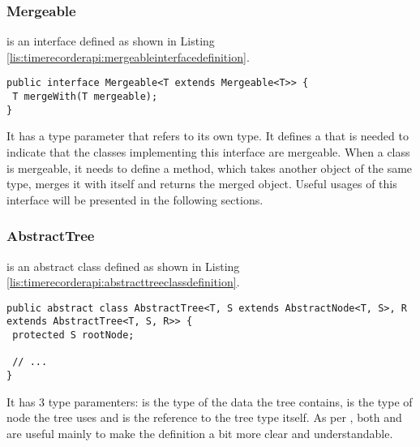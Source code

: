 \subsubsection{Mergeable}
 is an interface defined as shown in Listing \ref{lis:timerecorderapi:mergeableinterfacedefinition}.

\noindent\begin{minipage}[c]{\linewidth}
\begin{lstlisting}[breaklines,caption={Mergeable interface definition},label=lis:timerecorderapi:mergeableinterfacedefinition]
public interface Mergeable<T extends Mergeable<T>> {
 T mergeWith(T mergeable);
}
\end{lstlisting}
\end{minipage}

\noindent It has a type parameter  that refers to its own type. It defines a  that is needed to indicate that the classes implementing this interface are mergeable. When a class is mergeable, it needs to define a  method, which takes another object of the same type, merges it with itself and returns the merged object. Useful usages of this interface will be presented in the following sections.

\subsubsection{AbstractTree}

 is an abstract class defined as shown in Listing \ref{lis:timerecorderapi:abstracttreeclassdefinition}.

\noindent\begin{minipage}[c]{\linewidth}
\begin{lstlisting}[breaklines,caption={AbstractTree class definition},label=lis:timerecorderapi:abstracttreeclassdefinition]
public abstract class AbstractTree<T, S extends AbstractNode<T, S>, R extends AbstractTree<T, S, R>> {
 protected S rootNode;
 
 // ...
}
\end{lstlisting}
\end{minipage}

\noindent It has 3 type paramenters:  is the type of the data the tree contains,  is the type of node the tree uses and  is the reference to the tree type itself. As per , both  and  are useful mainly to make the definition a bit more clear and understandable.

